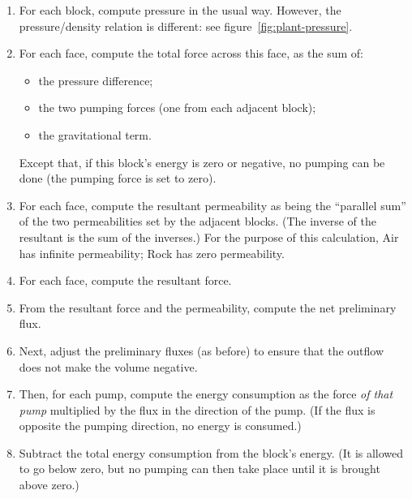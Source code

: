 \documentclass[10pt, a4paper, twocolumn]{article}
\begin{document}
\begin{enumerate}
\item For each block, compute pressure in the usual way. However, the
  pressure/density relation is different: see
  figure~\ref{fig:plant-pressure}.
\item For each face, compute the total force across this face, as the
  sum of:
  \begin{itemize}
  \item the pressure difference;
  \item the two pumping forces (one from each adjacent block);
  \item the gravitational term.
  \end{itemize}
  Except that, if this block's energy is zero or negative, no pumping
  can be done (the pumping force is set to zero).
\item For each face, compute the resultant permeability as being the
  ``parallel sum'' of the two permeabilities set by the adjacent
  blocks. (The inverse of the resultant is the sum of the inverses.)
  For the purpose of this calculation, Air has infinite permeability;
  Rock has zero permeability.
\item For each face, compute the resultant force.
\item From the resultant force and the permeability, compute the net
  preliminary flux.
\item Next, adjust the preliminary fluxes (as before) to ensure that the outflow
  does not make the volume negative.
\item Then, for each pump, compute the energy consumption as the force
  \emph{of that pump} multiplied by the flux in the direction of the
  pump. (If the flux is opposite the pumping direction, no energy is
  consumed.)
\item Subtract the total energy consumption from the block's
  energy. (It is allowed to go below zero, but no pumping can then
  take place until it is brought above zero.)
\end{enumerate}
\end{document}
